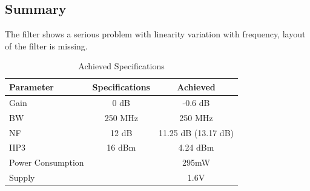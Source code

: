 \subsection{Summary}%
The filter shows a serious problem with linearity variation with
frequency, layout of the filter is missing.
\begin{table}[htpb]
    \centering
    \caption{Achieved Specifications}
    \label{tab:filter_specs_achieved}
    \begin{tabular}{l c c}
        \toprule
    \textbf{Parameter} & \textbf{Specifications} & 
    \textbf{Achieved} \\ \hline
    Gain & 0 dB & -0.6 dB \\ \hline
    BW & 250 MHz &  250 MHz \\ \hline
    NF & 12 dB & 11.25 dB (13.17 dB) \\ \hline
    IIP3 & 16 dBm & 4.24 dBm \\ \hline
    Power Consumption & & 295mW \\ \hline
    Supply & & 1.6V \\ \bottomrule
    \end{tabular}
\end{table}
%
%
















